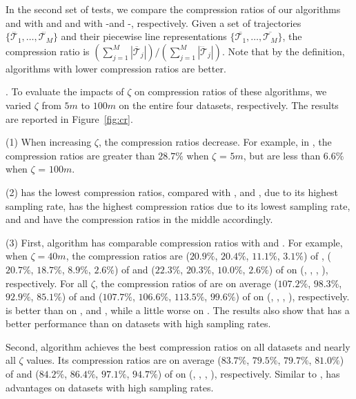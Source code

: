 In the second set of tests, we compare the compression ratios of our algorithms \operb and \operba with \dpa and \fbqsa
and with -\operb and -\operba, respectively.
Given a set of trajectories $\{\dddot{\mathcal{T}_1}, \ldots, \dddot{\mathcal{T}_M}\}$ and their piecewise line representations
$\{\overline{\mathcal{T}_1}, \ldots, \overline{\mathcal{T}_M}\}$,
 the compression ratio is $(\sum_{j=1}^{M} |\overline{\mathcal{T}}_j |)/(\sum_{j=1}^{M} |\dddot{\mathcal{T}}_j |)$.
 Note that by the definition, algorithms with lower compression ratios are better.



.
To evaluate the impacts of $\zeta$ on compression ratios of these algorithms, we varied $\zeta$ from $5m$ to $100m$ on
 the entire four datasets, respectively.
The results are reported in Figure~\ref{fig:cr}.

\sstab (1) When increasing $\zeta$, the compression ratios decrease. For example, in \sercar,
the compression ratios are greater than $28.7\%$ when $\zeta$ = $5m$, but are less than $6.6\%$ when $\zeta$ = $100m$.

\sstab (2) \geolife has the lowest compression ratios, compared with \taxi, \truck and \sercar,
due to its highest sampling rate, \taxi has the highest compression ratios due to its lowest sampling rate, and \truck and \sercar have the compression ratios in the middle accordingly.

\sstab (3) {First, algorithm \operb has comparable compression ratios with \fbqsa and \dpa.
For example, when $\zeta = 40m$, the compression ratios are ($20.9\%$, $20.4\%$, $11.1\%$, $3.1\%$) of \fbqsa, ($20.7\%$, $18.7\%$, $8.9\%$, $2.6\%$) of \dpa and ($22.3\%$, $20.3\%$, $10.0\%$, $2.6\%$) of \operb on (\taxi, \truck, \sercar, \geolife), respectively.
For all $\zeta$, the compression ratios of \operb are on average ($107.2\%$, $98.3\%$, $92.9\%$, {$85.1\%$}) of \fbqsa and ($107.7\%$, $106.6\%$, $113.5\%$, $99.6\%$) of \dpa on (\taxi, \truck, \sercar, \geolife), respectively.
\operb is better than  \fbqsa on \truck, \sercar and \geolife, while a little worse on \taxi. The results also show that \operb has a better performance than \fbqsa on datasets with high sampling rates.}

\ni Second, algorithm \operba achieves the best compression ratios on all datasets and nearly all $\zeta$ values.
Its compression ratios are on average ($83.7\%$, $79.5\%$, $79.7\%$, $81.0\%$) of \fbqsa and ($84.2\%$, $86.4\%$, $97.1\%$, $94.7\%$) of \dpa on (\taxi, \truck, \sercar, \geolife), respectively.
Similar to \operb, \operba has advantages on datasets with high sampling rates.



